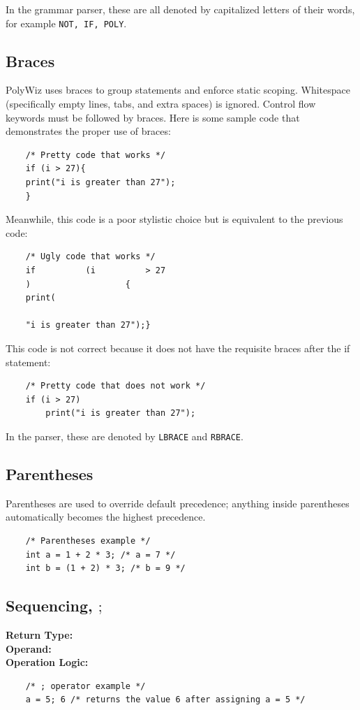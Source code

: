 \documentclass{article}
\begin{document}
In the grammar parser, these are all denoted by capitalized letters of their words, for example \lstinline{NOT, IF, POLY}.

\subsection{Braces}
PolyWiz uses braces to group statements and enforce static scoping. Whitespace (specifically empty lines, tabs, and extra spaces) is ignored. Control flow keywords must be followed by braces. Here is some sample code that demonstrates the proper use of braces:
\begin{lstlisting}
    /* Pretty code that works */
    if (i > 27){
    print("i is greater than 27");
    }
    \end{lstlisting}
Meanwhile, this code is a poor stylistic choice but is equivalent to the previous code:
\begin{lstlisting}
    /* Ugly code that works */
    if          (i          > 27
    )                   {
    print(
    
    "i is greater than 27");}
    \end{lstlisting}
This code is not correct because it does not have the requisite braces after the if statement:
\begin{lstlisting}
    /* Pretty code that does not work */
    if (i > 27)
        print("i is greater than 27");
    \end{lstlisting}

In the parser, these are denoted by \lstinline{LBRACE} and \lstinline{RBRACE}.

\subsection{Parentheses}
Parentheses are used to override default precedence; anything inside parentheses automatically becomes the highest precedence.
\begin{lstlisting}
    /* Parentheses example */
    int a = 1 + 2 * 3; /* a = 7 */
    int b = (1 + 2) * 3; /* b = 9 */
    \end{lstlisting}
    \subsection{Sequencing, $;$}
    \textbf{Return Type:}\\
    \textbf{Operand:}\\
    \textbf{Operation Logic:}\\
    \begin{lstlisting}
    /* ; operator example */
    a = 5; 6 /* returns the value 6 after assigning a = 5 */
    \end{lstlisting}
\end{document}
